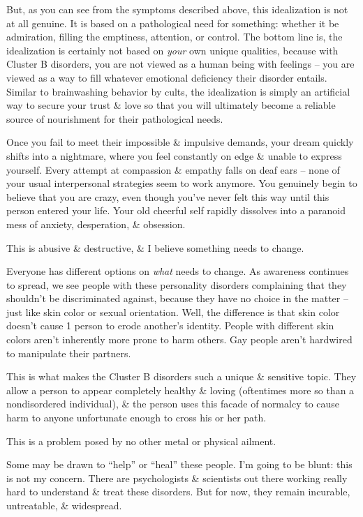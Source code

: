 \documentclass{article}
\numberwithin{equation}{section}
\begin{document}
But, as you can see from the symptoms described above, this idealization is not at all genuine. It is based on a pathological need for something: whether it be admiration, filling the emptiness, attention, or control. The bottom line is, the idealization is certainly not based on \textit{your} own unique qualities, because with Cluster B disorders, you are not viewed as a human being with feelings -- you are viewed as a way to fill whatever emotional deficiency their disorder entails. Similar to brainwashing behavior by cults, the idealization is simply an artificial way to secure your trust \& love so that you will ultimately become a reliable source of nourishment for their pathological needs.

Once you fail to meet their impossible \& impulsive demands, your dream quickly shifts into a nightmare, where you feel constantly on edge \& unable to express yourself. Every attempt at compassion \& empathy falls on deaf ears -- none of your usual interpersonal strategies seem to work anymore. You genuinely begin to believe that you are crazy, even though you've never felt this way until this person entered your life. Your old cheerful self rapidly dissolves into a paranoid mess of anxiety, desperation, \& obsession.

This is abusive \& destructive, \& I believe something needs to change.

Everyone has different options on \textit{what} needs to change. As awareness continues to spread, we see people with these personality disorders complaining that they shouldn't be discriminated against, because they have no choice in the matter -- just like skin color or sexual orientation. Well, the difference is that skin color doesn't cause 1 person to erode another's identity. People with different skin colors aren't inherently more prone to harm others. Gay people aren't hardwired to manipulate their partners.

This is what makes the Cluster B disorders such a unique \& sensitive topic. They allow a person to appear completely healthy \& loving (oftentimes more so than a nondisordered individual), \& the person uses this facade of normalcy to cause harm to anyone unfortunate enough to cross his or her path.

This is a problem posed by no other metal or physical ailment.

Some may be drawn to ``help'' or ``heal'' these people. I'm going to be blunt: this is not my concern. There are psychologists \& scientists out there working really hard to understand \& treat these disorders. But for now, they remain incurable, untreatable, \& widespread.
\end{document}
